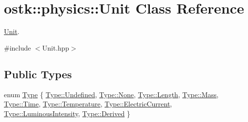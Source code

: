 \hypertarget{classostk_1_1physics_1_1_unit}{}\section{ostk\+:\+:physics\+:\+:Unit Class Reference}
\label{classostk_1_1physics_1_1_unit}


\hyperlink{classostk_1_1physics_1_1_unit}{Unit}.  




{\ttfamily \#include $<$Unit.\+hpp$>$}

\subsection*{Public Types}
\begin{DoxyCompactItemize}
\item 
enum \hyperlink{classostk_1_1physics_1_1_unit_a1c07d36cd02be8541eb972367e2b628f}{Type} \{ \newline
\hyperlink{classostk_1_1physics_1_1_unit_a1c07d36cd02be8541eb972367e2b628faec0fc0100c4fc1ce4eea230c3dc10360}{Type\+::\+Undefined}, 
\hyperlink{classostk_1_1physics_1_1_unit_a1c07d36cd02be8541eb972367e2b628fa6adf97f83acf6453d4a6a4b1070f3754}{Type\+::\+None}, 
\hyperlink{classostk_1_1physics_1_1_unit_a1c07d36cd02be8541eb972367e2b628faba2a9c6c8c77e03f83ef8bf543612275}{Type\+::\+Length}, 
\hyperlink{classostk_1_1physics_1_1_unit_a1c07d36cd02be8541eb972367e2b628faff2864d6f652ee0ac254814f1ae4f4a8}{Type\+::\+Mass}, 
\newline
\hyperlink{classostk_1_1physics_1_1_unit_a1c07d36cd02be8541eb972367e2b628faa76d4ef5f3f6a672bbfab2865563e530}{Type\+::\+Time}, 
\hyperlink{classostk_1_1physics_1_1_unit_a1c07d36cd02be8541eb972367e2b628faee7a8e262285ed49ea1b4e4ae11525bd}{Type\+::\+Temperature}, 
\hyperlink{classostk_1_1physics_1_1_unit_a1c07d36cd02be8541eb972367e2b628fa9a60fd92ac6161bffa549ef2cd17f05e}{Type\+::\+Electric\+Current}, 
\hyperlink{classostk_1_1physics_1_1_unit_a1c07d36cd02be8541eb972367e2b628fae91a9eb4f5dcc51ea18e180ea981d6ae}{Type\+::\+Luminous\+Intensity}, 
\newline
\hyperlink{classostk_1_1physics_1_1_unit_a1c07d36cd02be8541eb972367e2b628fa0e77a10e9579997fa646fbda4118e108}{Type\+::\+Derived}
 \}
\end{DoxyCompactItemize}
